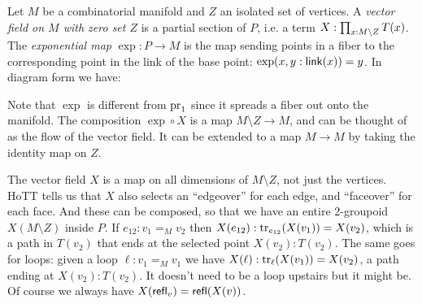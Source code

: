 \begin{mydef}
Let \( M \) be a combinatorial manifold and \( Z \) an isolated set of vertices. A \emph{vector field on \( M \) with zero set \( Z \)} is a partial section of \( P \), i.e. a term \( X:\prod_{x:M\setminus Z}T(x) \). The \emph{exponential map} \( \exp:P\to M \) is the map sending points in a fiber to the corresponding point in the link of the base point: \( \exp(x, y:\mathsf{link}(x))=y \). In diagram form we have:
\end{mydef}
\begin{center}
\end{center}

Note that \( \exp \) is different from \( \mathrm{pr}_1 \) since it spreads a fiber out onto the manifold. The composition \( \exp\circ X \) is a map \( M\setminus Z\to M \), and can be thought of as the flow of the vector field. It can be extended to a map \( M\to M \) by taking the identity map on \( Z \).

The vector field \( X \) is a map on all dimensions of \( M\setminus Z \), not just the vertices. HoTT tells us that \( X \) also selects an ``edgeover'' for each edge, and ``faceover'' for each face. And these can be composed, so that we have an entire 2-groupoid \( X(M\setminus Z) \) inside \( P \). If \( e_{12}:v_1=_M v_2 \) then \( X(e_{12}):\mathrm{tr}_{e_{12}}(X(v_1))=X(v_2) \), which is a path in \( T(v_2) \) that ends at the selected point \( X(v_2):T(v_2) \). The same goes for loops: given a loop \( \ell:v_1=_M v_1 \) we have \( X(\ell):\mathrm{tr}_\ell(X(v_1))=X(v_2) \), a path ending at \( X(v_2):T(v_2) \). It doesn't need to be a loop upstairs but it might be. Of course we always have \( X(\mathsf{refl}_{v})=\mathsf{refl}(X(v)) \).

